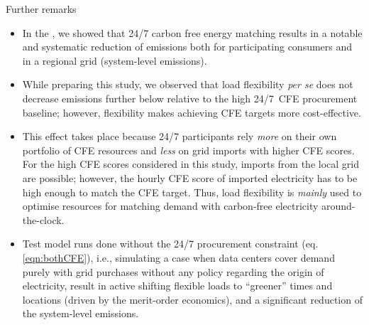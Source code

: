 \begin{frame}{Further remarks}

  {\footnotesize 

  \begin{itemize}

  \item  In the , we showed that 24/7 carbon free energy matching results in a \alert{notable and systematic reduction of emissions} both for participating consumers and in a regional grid (system-level emissions). 
  
  \item While preparing this study, we observed that load flexibility \textit{per se} does not decrease emissions further below relative to the high 24/7~CFE procurement baseline; however, flexibility makes achieving CFE targets \alert{more cost-effective}.

  \item This effect takes place because 24/7 participants rely \textit{more} on their own portfolio of CFE resources and \textit{less} on grid imports with higher CFE scores.
  For the high CFE scores considered in this study, imports from the local grid are possible; however, the hourly CFE score of imported electricity has to be high enough to match the CFE target. 
  Thus, load flexibility is \textit{mainly} used to optimise resources for matching demand with carbon-free electricity around-the-clock. 

  \item Test model runs done without the 24/7 procurement constraint (eq. \ref{eqn:bothCFE}), i.e., simulating a case when data centers cover demand purely with grid purchases without any policy regarding the origin of electricity, result in active shifting flexible loads to \enquote{greener} times and locations (driven by the merit-order economics), and a significant reduction of the system-level emissions.

  \end{itemize}
  }
\end{frame}


